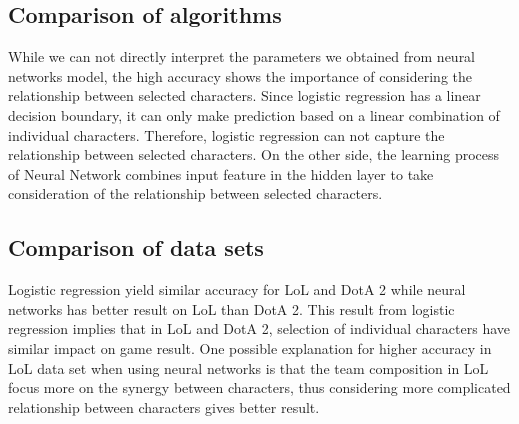 \documentclass[conference]{IEEEtran}
\begin{document}
\subsection{Comparison of algorithms}
While we can not directly interpret the parameters we obtained from neural networks model, the high accuracy shows the importance of considering the relationship between selected characters. Since logistic regression has a linear decision boundary, it can only make prediction based on a linear combination of individual characters. Therefore, logistic regression can not capture the relationship between selected characters. On the other side, the learning process of Neural Network combines input feature in the hidden layer to take consideration of the relationship between selected characters.

\subsection{Comparison of data sets}
Logistic regression yield similar accuracy for LoL and DotA 2 while neural networks has better result on LoL than DotA 2. This result from logistic regression implies that in LoL and DotA 2, selection of individual characters have similar impact on game result. One possible explanation for higher accuracy in LoL data set when using neural networks is that the team composition in LoL focus more on the synergy between characters, thus considering more complicated relationship between characters gives better result. 
%
%
\end{document}

